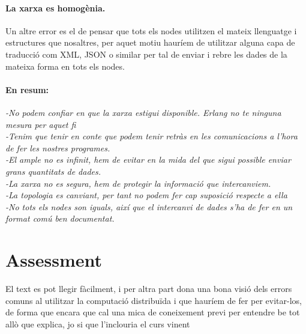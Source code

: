 \documentclass[a4paper, 10pt]{article}
\begin{document}
\paragraph{La xarxa es homogènia.\\}
\hspace{-0,40cm}Un altre error es el de pensar que tots els nodes utilitzen el mateix llenguatge i estructures que nosaltres, per aquet motiu hauríem de utilitzar alguna capa de traducció com XML, JSON o similar per tal de enviar i rebre les dades de la mateixa forma en tots els nodes.

\paragraph{En resum:\\}\hspace{-0,55cm}
\textit{-No podem confiar en que la xarxa estigui disponible. Erlang no te ninguna mesura per aquet fi \\}
\textit{-Tenim que tenir en conte que podem tenir retràs en les comunicacions a l'hora de fer les nostres programes.\\}
\textit{-El ample no es infinit, hem de evitar en la mida del que sigui possible enviar grans quantitats de dades.\\}
\textit{-La xarxa no es segura, hem de protegir la informació que intercanviem.\\}
\textit{-La topologia es canviant, per tant no podem fer cap suposició respecte a ella\\}
\textit{-No tots els nodes son iguals, així que el intercanvi de dades s'ha de fer en un format comú ben documentat.}
\section{Assessment}

El text es pot llegir fàcilment, i per altra part dona una bona visió dels errors comuns al utilitzar la computació distribuïda i que hauríem de fer per evitar-los, de forma que encara que cal una mica de coneixement previ per entendre be tot allò que explica, jo si que l'inclouria el curs vinent

 
\end{document}
